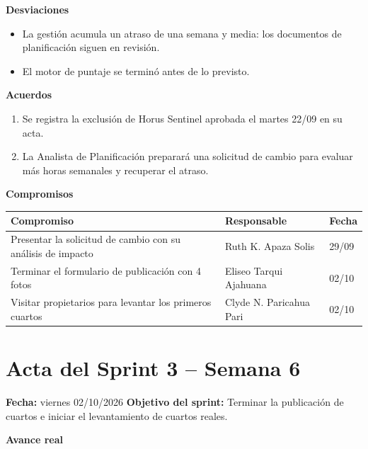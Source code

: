 \documentclass[11pt,a4paper]{article}
\begin{document}
\vspace{0.1cm}
\noindent\textbf{Desviaciones}
\begin{itemize}[leftmargin=*, itemsep=0pt]
    \item La gestión acumula un atraso de una semana y media: los documentos de planificación siguen en revisión.
    \item El motor de puntaje se terminó antes de lo previsto.
\end{itemize}
\noindent\textbf{Acuerdos}
\begin{enumerate}[leftmargin=*, itemsep=0pt]
    \item Se registra la exclusión de Horus Sentinel aprobada el martes 22/09 en su acta.
    \item La Analista de Planificación preparará una solicitud de cambio para evaluar más horas semanales y recuperar el atraso.
\end{enumerate}
\noindent\textbf{Compromisos}

\vspace{0.05cm}
{\footnotesize
{}
\noindent\begin{tabularx}{\textwidth}{@{}L P{3.6cm} C{1.6cm}@{}}
\toprule
{}
\textbf{Compromiso} & \textbf{Responsable} & \textbf{Fecha} \\
\midrule
Presentar la solicitud de cambio con su análisis de impacto & Ruth K. Apaza Solis & 29/09 \\
Terminar el formulario de publicación con 4 fotos & Eliseo Tarqui Ajahuana & 02/10 \\
Visitar propietarios para levantar los primeros cuartos & Clyde N. Paricahua Pari & 02/10 \\
\bottomrule
\end{tabularx}
}

\section{Acta del Sprint 3 -- Semana 6}
\noindent\textbf{Fecha:} viernes 02/10/2026 \quad \textbar\quad \textbf{Objetivo del sprint:} Terminar la publicación de cuartos e iniciar el levantamiento de cuartos reales.

\vspace{0.1cm}
\noindent\textbf{Avance real}
\end{document}
